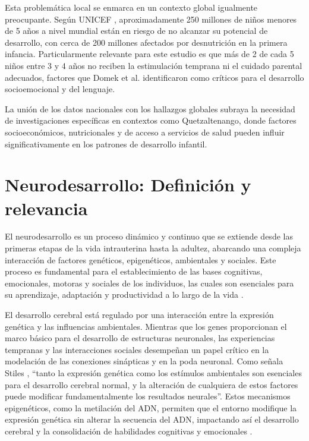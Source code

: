 Esta problemática local se enmarca en un contexto global igualmente 
preocupante. Según UNICEF \cite{UNICEF2023}, aproximadamente 250 millones de 
niños menores de 5 años a nivel mundial están en riesgo de no alcanzar su 
potencial de desarrollo, con cerca de 200 millones afectados por desnutrición 
en la primera infancia. Particularmente relevante para este estudio es que más
de 2 de cada 5 niños entre 3 y 4 años no reciben la estimulación temprana ni el
cuidado parental adecuados, factores que Domek et al. \cite{Domek2023} 
identificaron como críticos para el desarrollo socioemocional y del lenguaje. 

La unión de los datos nacionales con los hallazgos globales subraya la 
necesidad de investigaciones específicas en contextos como Quetzaltenango, 
donde factores socioeconómicos, nutricionales y de acceso a servicios de salud 
pueden influir significativamente en los patrones de desarrollo infantil.

\section{Neurodesarrollo: Definición y relevancia}
El neurodesarrollo es un proceso dinámico y continuo que se extiende desde 
las primeras etapas de la vida intrauterina hasta la adultez, abarcando una 
compleja interacción de factores genéticos, epigenéticos, ambientales y 
sociales. Este proceso es fundamental para el establecimiento de las bases 
cognitivas, emocionales, motoras y sociales de los individuos, las cuales 
son esenciales para su aprendizaje, adaptación y productividad a lo largo 
de la vida \cite{Stiles2010, Nelson49}.

El desarrollo cerebral está regulado por una interacción entre la expresión 
genética y las influencias ambientales. Mientras que los genes proporcionan 
el marco básico para el desarrollo de estructuras neuronales, las 
experiencias tempranas y las interacciones sociales desempeñan un papel 
crítico en la modelación de las conexiones sinápticas y en la poda neuronal. 
Como señala Stiles \cite{Stiles2010}, ``tanto la expresión genética como los
estímulos ambientales son esenciales para el desarrollo cerebral normal, y la
alteración de cualquiera de estos factores puede modificar fundamentalmente los
resultados neurales''. Estos mecanismos epigenéticos, como la metilación del
ADN, permiten que el entorno modifique la expresión genética sin alterar la
secuencia del ADN,  impactando así el desarrollo cerebral y la consolidación de
habilidades cognitivas y emocionales \cite{Roth2011, Feldman2}.

